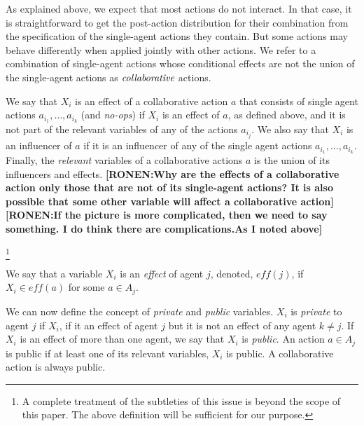 \documentclass[letterpaper]{article} %
\newcommand{\eliran}[1]{\textbf{[\color{red}ELIRAN:#1]}}
\newcommand{\ronen}[1]{\textbf{[\color{blue}RONEN:#1]}}
\begin{document}

As explained above, we expect that most actions do not interact. In that case, it is straightforward to get the post-action distribution for their combination from the specification of the single-agent actions they contain. But some actions may behave differently when applied jointly with other actions. We refer to a combination of single-agent actions whose conditional effects are not the union of the single-agent actions as $\emph{collaborative}$ actions. 

We say that $X_i$ is an effect of a collaborative action $a$ that consists of single agent actions
$a_{i_1},\ldots,a_{i_k}$ (and {\em no-ops}) if $X_i$ is an effect of $a$, as defined above, and it is not part of
the relevant variables of any of the actions $a_{i_j}$.
We also say that $X_i$ is an influencer of $a$ if it is an influencer of any of the single agent actions $a_{i_1},\ldots,a_{i_k}$.
Finally, the {\em relevant} variables of a collaborative actions $a$ is the union of its influencers and effects.
\ronen{Why are the effects of a collaborative action only those that are not of its single-agent actions? It is also possible that  some other variable will affect a collaborative action}
%
\ronen{If the picture is more complicated, then we need to say something. I do think there are complications.As I noted above}

\footnote{A complete treatment of the subtleties of this issue is beyond the scope of this paper. The above definition will be sufficient for our purpose.}

We say that a variable $X_i$ is an \emph{effect} of agent $j$, denoted,
$eff(j)$, if  $X_i\in eff(a)$ for some $a\in A_j$.

We can now define the concept of {\em private} and {\em public} variables. $X_i$ is {\em private} to agent $j$ if $X_i$, if it an effect of agent $j$ but it is not an effect of any agent $k\neq j$. If $X_i$ is an effect of more than one agent, we say that $X_i$ is {\em public}. 
An action $a\in A_j$ is public if at least one of its relevant variables, $X_i$ is public. A collaborative action is always public.
\end{document}
